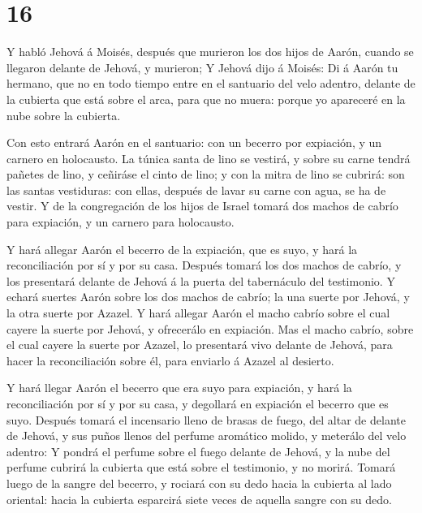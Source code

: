 \hypertarget{section-15}{%
\section{16}\label{section-15}}

 Y habló Jehová á Moisés, después que murieron los dos hijos
de Aarón, cuando se llegaron delante de Jehová, y murieron; 
Y Jehová dijo á Moisés: Di á Aarón tu hermano, que no en todo tiempo
entre en el santuario del velo adentro, delante de la cubierta que está
sobre el arca, para que no muera: porque yo apareceré en la nube sobre
la cubierta.

 Con esto entrará Aarón en el santuario: con un becerro por
expiación, y un carnero en holocausto.  La túnica santa de
lino se vestirá, y sobre su carne tendrá pañetes de lino, y ceñiráse el
cinto de lino; y con la mitra de lino se cubrirá: son las santas
vestiduras: con ellas, después de lavar su carne con agua, se ha de
vestir.  Y de la congregación de los hijos de Israel tomará
dos machos de cabrío para expiación, y un carnero para holocausto.

 Y hará allegar Aarón el becerro de la expiación, que es
suyo, y hará la reconciliación por sí y por su casa. 
Después tomará los dos machos de cabrío, y los presentará delante de
Jehová á la puerta del tabernáculo del testimonio.  Y echará
suertes Aarón sobre los dos machos de cabrío; la una suerte por Jehová,
y la otra suerte por Azazel.  Y hará allegar Aarón el macho
cabrío sobre el cual cayere la suerte por Jehová, y ofrecerálo en
expiación.  Mas el macho cabrío, sobre el cual cayere la
suerte por Azazel, lo presentará vivo delante de Jehová, para hacer la
reconciliación sobre él, para enviarlo á Azazel al desierto.

 Y hará llegar Aarón el becerro que era suyo para
expiación, y hará la reconciliación por sí y por su casa, y degollará en
expiación el becerro que es suyo.  Después tomará el
incensario lleno de brasas de fuego, del altar de delante de Jehová, y
sus puños llenos del perfume aromático molido, y meterálo del velo
adentro:  Y pondrá el perfume sobre el fuego delante de
Jehová, y la nube del perfume cubrirá la cubierta que está sobre el
testimonio, y no morirá.  Tomará luego de la sangre del
becerro, y rociará con su dedo hacia la cubierta al lado oriental: hacia
la cubierta esparcirá siete veces de aquella sangre con su dedo.

